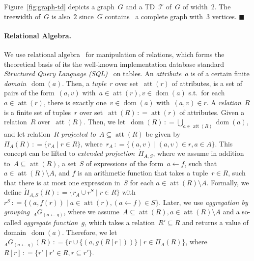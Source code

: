 \documentclass{llncs}
\newcommand{\eqdef}{\ensuremath{\,\mathrel{\mathop:}=}}
\newcommand{\TTT}{\mathcal{T}}
\DeclareMathOperator{\dom}{dom}
\DeclareMathOperator{\attr}{att}
\renewenvironment{example}{\begin{EXa}}{\hfill\ensuremath{\blacksquare}\end{EXa}}
\begin{document}
\begin{example}
Figure~\ref{fig:graph-td} depicts a graph~$G$
and a TD~$\TTT$ of~$G$ of width~$2$.
  The treewidth of~$G$ is also~$2$ since~$G$ contains~\cite{Kloks94a} a complete graph with~$3$ vertices.
\end{example}
%
%
%
%
%

\paragraph*{Relational Algebra.}%
We use relational algebra~\cite{Codd70} for manipulation of relations,
which forms the theoretical basis of its the well-known implementation database standard 
\emph{Structured Query Language (SQL)}~\cite{} on tables.
An \emph{attribute}~$a$ is of a certain finite \emph{domain~$\dom(a)$}.
Then, a \emph{tuple}~$r$ over set~$\attr(r)$ of attributes,
is a set of pairs of the form~$(a, v)$ with~$a\in\attr(r),v\in \dom(a)$ s.t.\ for each~$a\in \attr(r)$, there is exactly one~$v\in\dom(a)$ with~$(a,v)\in r$.
A \emph{relation~$R$} is a finite set of tuples~$r$ over set~$\attr(R)\eqdef\attr(r)$ of attributes.
Given a relation~$R$ over~$\attr(R)$.
Then, we let~$\dom(R)\eqdef \bigcup_{a\in \attr(R)}\dom(a)$, and let relation~$R$ \emph{projected to~$A\subseteq \attr(R)$} be given by $\Pi_{A}(R)\eqdef \{r_A \mid r\in R\}$, where~$r_A \eqdef \{(a, v) \mid (a, v) \in r, a \in A\}$.
This concept can be lifted to \emph{extended projection~$\dot\Pi_{A,S}$}, where we assume in addition to~$A\subseteq \attr(R)$, a set~$S$ of expressions of the form~$a \leftarrow f$, such that $a\in \attr(R)\setminus A$, and $f$ is an arithmetic function that takes a tuple~$r\in R$,
such that there is at most one expression in~$S$ for each $a\in \attr(R)\setminus A$.
Formally, we define $\dot\Pi_{A,S}(R)\eqdef \{r_A \cup r^S \mid r\in R\}$ with~$r^S \eqdef \{(a, f(r)) \mid a \in \attr(r), (a \leftarrow f) \in S\}$.
Later, we use \emph{aggregation by grouping~$_A G_{(a\leftarrow g)}$}, where we assume~$A\subseteq \attr(R), a\in\attr(R)\setminus A$ and a so-called \emph{aggregate function~$g$}, which takes a relation~$R'\subseteq R$ and returns a value of domain~$\dom(a)$. Therefore, we let~$_A G_{(a\leftarrow g)}(R)\eqdef \{r\cup \{(a,g(R[r]))\} \mid r\in\Pi_{A}(R)\}$, where $R[r]\eqdef\{r'\mid r'\in R, r\subseteq r'\}$.
\end{document}
